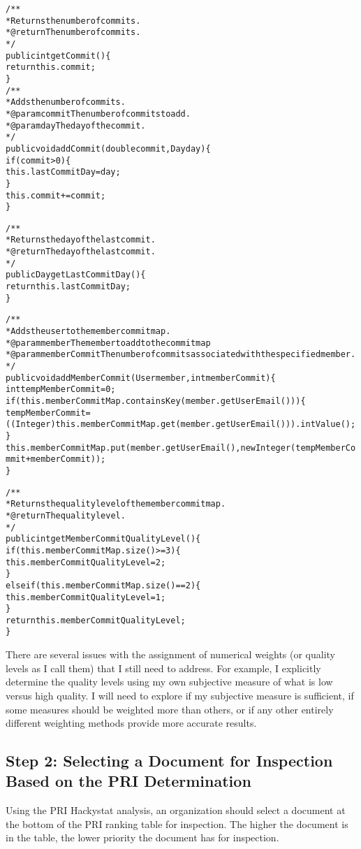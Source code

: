 \begin{alltt}
{
\scriptsize{}

  /**
   * Returns the number of commits.
   * @return The number of commits.
   */
  public int getCommit() \{
    return this.commit;
  \}
    /**
   * Adds the number of commits. 
   * @param commit The number of commits to add.
   * @param day The day of the commit.
   */
  public void addCommit(double commit, Day day) \{
    if (commit > 0) \{
      this.lastCommitDay = day;
    \}
    this.commit += commit;
  \}
  
  /**
   * Returns the day of the last commit.
   * @return The day of the last commit.
   */
  public Day getLastCommitDay() \{
    return this.lastCommitDay;
  \}
  
  /**
   * Adds the user to the member commit map.
   * @param member The member to add to the commit map
   * @param memberCommit The number of commits associated with the specified member.
   */
  public void addMemberCommit(User member, int memberCommit) \{
    int tempMemberCommit = 0;
    if (this.memberCommitMap.containsKey(member.getUserEmail())) \{
      tempMemberCommit = ((Integer) this.memberCommitMap.get(member.getUserEmail())).intValue();
    \}
    this.memberCommitMap.put(member.getUserEmail(), new Integer(tempMemberCommit + memberCommit));
  \}
  
  /**
   * Returns the quality level of the member commit map.
   * @return The quality level.
   */
  public int getMemberCommitQualityLevel() \{
    if (this.memberCommitMap.size() >= 3) \{
      this.memberCommitQualityLevel = 2;
    \}
    else if (this.memberCommitMap.size() == 2) \{
      this.memberCommitQualityLevel = 1;
    \}
    return this.memberCommitQualityLevel;
  \}
}
\end{alltt}

There are several issues with the assignment of numerical weights (or
quality levels as I call them) that I still need to address. For example, I
explicitly determine the quality levels using my own subjective measure of
what is low versus high quality. I will need to explore if my subjective
measure is sufficient, if some measures should be weighted more than
others, or if any other entirely different weighting methods provide more
accurate results.

\subsection{Step 2: Selecting a Document for Inspection Based on the PRI
  Determination} Using the PRI Hackystat analysis, an organization should
select a document at the bottom of the PRI ranking table for inspection.
The higher the document is in the table, the lower priority the document
has for inspection.

